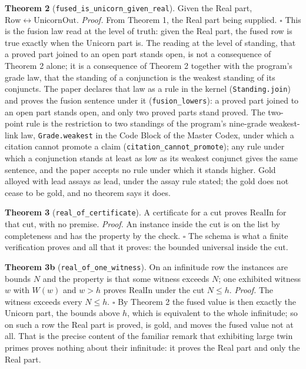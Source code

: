 \documentclass[10pt]{article}
\begin{document}
\textbf{Theorem 2} (\texttt{fused\_is\_unicorn\_given\_real}). Given the
Real part, \(\mathrm{Row} \leftrightarrow \mathrm{UnicornOut}\).
\emph{Proof.} From Theorem 1, the Real part being supplied. \(\square\)
This is the fusion law read at the level of truth: given the Real part,
the fused row is true exactly when the Unicorn part is. The reading at
the level of standing, that a proved part joined to an open part stands
open, is not a consequence of Theorem 2 alone; it is a consequence of
Theorem 2 together with the program's grade law, that the standing of a
conjunction is the weakest standing of its conjuncts. The paper declares
that law as a rule in the kernel (\texttt{Standing.join}) and proves the
fusion sentence under it (\texttt{fusion\_lowers}): a proved part joined
to an open part stands open, and only two proved parts stand proved. The
two-point rule is the restriction to two standings of the program's
nine-grade weakest-link law, \texttt{Grade.weakest} in the Code Block of
the Master Codex, under which a citation cannot promote a claim
(\texttt{citation\_cannot\_promote}); any rule under which a conjunction
stands at least as low as its weakest conjunct gives the same sentence,
and the paper accepts no rule under which it stands higher. Gold alloyed
with lead assays as lead, under the assay rule stated; the gold does not
cease to be gold, and no theorem says it does.

\textbf{Theorem 3} (\texttt{real\_of\_certificate}). A certificate for a
cut proves \(\mathrm{RealIn}\) for that cut, with no premise.
\emph{Proof.} An instance inside the cut is on the list by completeness
and has the property by the check. \(\square\) The schema is what a
finite verification proves and all that it proves: the bounded universal
inside the cut.

\textbf{Theorem 3b} (\texttt{real\_of\_one\_witness}). On an infinitude
row the instances are bounds \(N\) and the property is that some witness
exceeds \(N\); one exhibited witness \(w\) with \(W(w)\) and \(w > h\)
proves \(\mathrm{RealIn}\) under the cut \(N \le h\). \emph{Proof.} The
witness exceeds every \(N \le h\). \(\square\) By Theorem 2 the fused
value is then exactly the Unicorn part, the bounds above \(h\), which is
equivalent to the whole infinitude; so on such a row the Real part is
proved, is gold, and moves the fused value not at all. That is the
precise content of the familiar remark that exhibiting large twin primes
proves nothing about their infinitude: it proves the Real part and only
the Real part.
\end{document}
